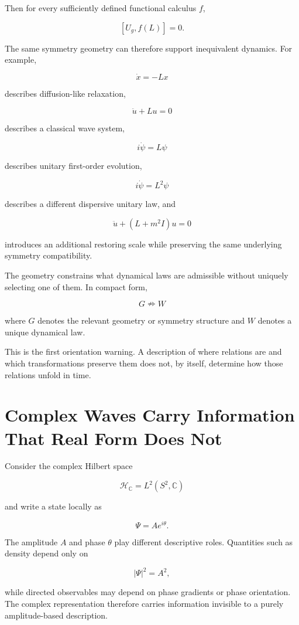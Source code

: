 Then for every sufficiently defined functional calculus $f$,

\[
[U_g,f(L)]=0.
\]

The same symmetry geometry can therefore support inequivalent dynamics. For example,

\[
\dot x=-Lx
\]

describes diffusion-like relaxation,

\[
\ddot u+Lu=0
\]

describes a classical wave system,

\[
i\dot\psi=L\psi
\]

describes unitary first-order evolution,

\[
i\dot\psi=L^2\psi
\]

describes a different dispersive unitary law, and

\[
\ddot u+(L+m^2I)u=0
\]

introduces an additional restoring scale while preserving the same underlying symmetry compatibility.

The geometry constrains what dynamical laws are admissible without uniquely selecting one of them. In compact form,

\[
\boxed{G\nRightarrow W}
\]

where $G$ denotes the relevant geometry or symmetry structure and $W$ denotes a unique dynamical law.

This is the first orientation warning. A description of where relations are and which transformations preserve them does not, by itself, determine how those relations unfold in time.

\section{Complex Waves Carry Information That Real Form Does Not}

Consider the complex Hilbert space

\[
\mathcal H_{\mathbb C}=L^2(S^2,\mathbb C)
\]

and write a state locally as

\[
\Psi=Ae^{i\theta}.
\]

The amplitude $A$ and phase $\theta$ play different descriptive roles. Quantities such as density depend only on

\[
|\Psi|^2=A^2,
\]

while directed observables may depend on phase gradients or phase orientation. The complex representation therefore carries information invisible to a purely amplitude-based description.

